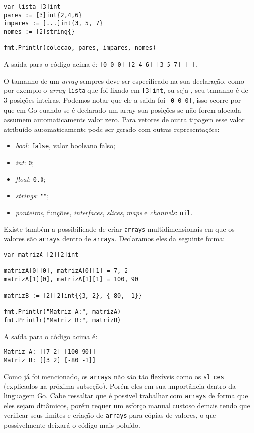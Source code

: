 \documentclass{SBCbookchapter}
\begin{document}
\begin{lstlisting}
var lista [3]int
pares := [3]int{2,4,6}
impares := [...]int{3, 5, 7}
nomes := [2]string{}

fmt.Println(colecao, pares, impares, nomes)
\end{lstlisting}

A saída para o código acima é: \texttt{[0 0 0] [2 4 6] [3 5 7] [ ]}.

O tamanho de um \textit{array} sempres deve ser especificado na sua declaração, como por exemplo o \textit{array} \texttt{lista} que foi fixado em \texttt{[3]int}, ou seja , seu tamanho é de 3 posições inteiras. Podemos notar que ele a saida foi \texttt{[0 0 0]}, isso ocorre por que em Go quando se é declarado um array sua posições se não forem alocada assumem automaticamente valor zero. Para vetores de outra tipagem esse valor atribuído automaticamente pode ser gerado com outras representações:

\begin{itemize}
\item \textit{bool}: \texttt{false}, valor booleano falso;
\item \textit{int}: \texttt{0};
\item \textit{float}: \texttt{0.0};
\item \textit{strings}: \texttt{""};
\item \textit{ponteiros}, funções, \textit{interfaces}, \textit{slices}, \textit{maps} e \textit{channels}: \texttt{nil}.
\end{itemize}


Existe também a possibilidade de criar \texttt{arrays} multidimensionais em que os valores são \texttt{arrays} dentro de \texttt{arrays}. Declaramos eles da seguinte forma:


\begin{lstlisting}
var matrizA [2][2]int

matrizA[0][0], matrizA[0][1] = 7, 2
matrizA[1][0], matrizA[1][1] = 100, 90

matrizB := [2][2]int{{3, 2}, {-80, -1}}

fmt.Println("Matriz A:", matrizA)
fmt.Println("Matriz B:", matrizB)
\end{lstlisting}

A saída para o código acima é:

\noindent\texttt{Matriz A: [[7 2] [100 90]]}\\
\texttt{Matriz B: [[3 2] [-80 -1]]}

Como já foi mencionado, os \texttt{arrays} não são tão flexíveis como os \texttt{slices} (explicados na próxima subseção). Porém eles em sua importância dentro da linguagem Go. Cabe ressaltar que é possivel trabalhar com \texttt{arrays} de forma que eles sejam dinâmicos, porém requer um esforço manual custoso demais tendo que verificar seus limites e criação de \texttt{arrays} para cópias de valores, o que possivelmente deixará o código mais poluído.
\end{document}
